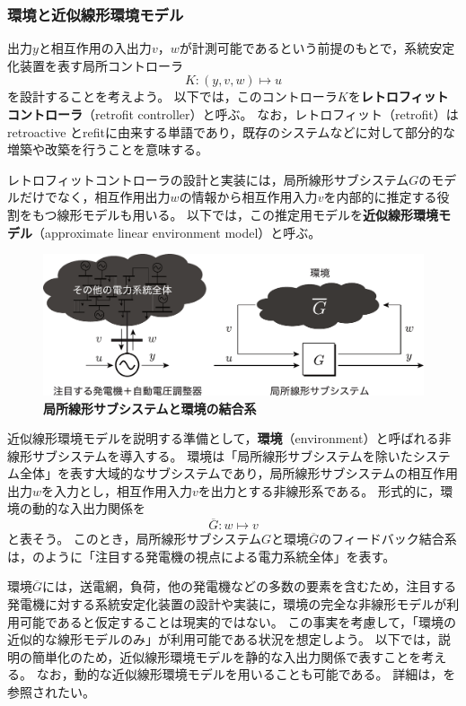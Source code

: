 \documentclass[tombow,dvipdfmx]{corona-a5-1.1}
\begin{document}
\smallskip
\subsubsection{環境と近似線形環境モデル}

出力$y$と相互作用の入出力$v$，$w$が計測可能であるという前提のもとで，系統安定化装置を表す局所コントローラ
\[
K : (y,v,w)\mapsto u
\]
を設計することを考えよう。
以下では，このコントローラ$K$を\textbf{レトロフィットコントローラ}（retrofit controller）と呼ぶ。
なお，レトロフィット（retrofit）はretroactive とrefitに由来する単語であり，既存のシステムなどに対して部分的な増築や改築を行うことを意味する。

レトロフィットコントローラの設計と実装には，局所線形サブシステム$G$のモデルだけでなく，相互作用出力$w$の情報から相互作用入力$v$を内部的に推定する役割をもつ線形モデルも用いる。
以下では，この推定用モデルを\textbf{近似線形環境モデル}（approximate linear environment model）と呼ぶ。


\begin{figure}[t]
\centering
\includegraphics[width = .99\linewidth]{figs/retconsys2}
\medskip
\caption{\textbf{局所線形サブシステムと環境の結合系}}
\label{fig:retconsys}
\medskip
\end{figure}


近似線形環境モデルを説明する準備として，\textbf{環境}（environment）と呼ばれる非線形サブシステムを導入する。
環境は「局所線形サブシステムを除いたシステム全体」を表す大域的なサブシステムであり，局所線形サブシステムの相互作用出力$w$を入力とし，相互作用入力$v$を出力とする非線形系である。
形式的に，環境の動的な入出力関係を
\[
\overline{G} : w\mapsto v
\]
と表そう。
このとき，局所線形サブシステム$G$と環境$\overline{G}$のフィードバック結合系は，のように「注目する発電機の視点による電力系統全体」を表す。

環境$\overline{G}$には，送電網，負荷，他の発電機などの多数の要素を含むため，注目する発電機に対する系統安定化装置の設計や実装に，環境の完全な非線形モデルが利用可能であると仮定することは現実的ではない。
この事実を考慮して，「環境の近似的な線形モデルのみ」が利用可能である状況を想定しよう。
以下では，説明の簡単化のため，近似線形環境モデルを静的な入出力関係で表すことを考える。
なお，動的な近似線形環境モデルを用いることも可能である。
詳細は，\cite{ishizaki2019retrofit}を参照されたい。
\end{document}
